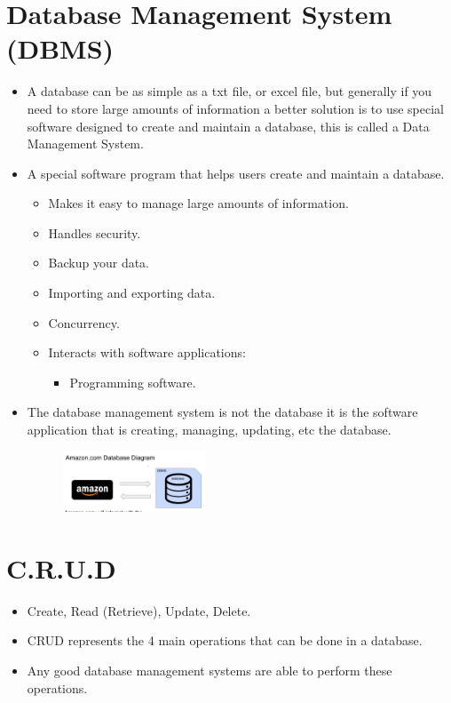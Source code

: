 \section{Database Management System (DBMS)}
\begin{itemize}
    \item A database can be as simple as a txt file, or excel file, but generally if you need to store large amounts of information a better solution is to use special software designed to create and maintain a database, this is called a Data Management System.
    \item A special software program that helps users create and maintain a database.
        \begin{itemize}
            \item Makes it easy to manage large amounts of information.
            \item Handles security.
            \item Backup your data.
            \item Importing and exporting data.
            \item Concurrency.
            \item Interacts with software applications:
                \begin{itemize}
                    \item Programming software.
                \end{itemize}
        \end{itemize}
    
    \item The database management system is not the database it is the software application that is creating, managing, updating, etc the database.
        \begin{figure}[H]
            \centering
            \includegraphics[width=0.4\textwidth]{./figs/dbamazon.png}
        \end{figure}
\end{itemize}

\section{C.R.U.D}
\begin{itemize}
    \item Create, Read (Retrieve), Update, Delete.
    \item CRUD represents the 4 main operations that can be done in a database.
    \item Any good database management systems are able to perform these operations.
\end{itemize}

